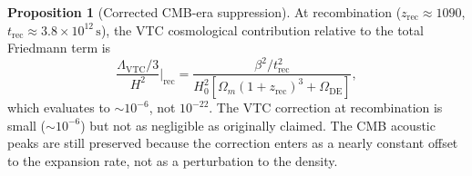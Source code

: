 \documentclass[11pt,a4paper]{article}
\theoremstyle{definition}
\newtheorem{proposition}[theorem]{Proposition}
\newcommand{\VTC}{\mathrm{VTC}}
\newcommand{\rec}{\mathrm{rec}}
\newcommand{\DE}{\mathrm{DE}}
\begin{document}
\begin{proposition}[Corrected CMB-era suppression]
At recombination ($z_{\rec} \approx 1090$, $t_{\rec} \approx 3.8\times 10^{12}\,\mathrm{s}$), the VTC cosmological contribution relative to the total Friedmann term is
\begin{equation}
\frac{\Lambda_{\VTC}/3}{H^2}\bigg|_{\rec} = \frac{\beta^2/t_{\rec}^2}{H_0^2[\Omega_m(1+z_{\rec})^3 + \Omega_\DE]},
\end{equation}
which evaluates to $\sim 10^{-6}$, not $10^{-22}$. The VTC correction at recombination is small ($\sim 10^{-6}$) but not as negligible as originally claimed. The CMB acoustic peaks are still preserved because the correction enters as a nearly constant offset to the expansion rate, not as a perturbation to the density.
\end{proposition}
\end{document}
